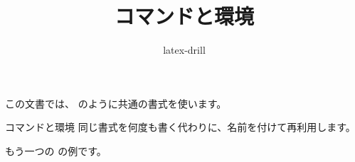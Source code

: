 \documentclass{jlreq}
\begin{document}
\title{コマンドと環境}
\author{latex-drill}
\maketitle

この文書では、 のように共通の書式を使います。

\begin{drillnote}{コマンドと環境}
同じ書式を何度も書く代わりに、名前を付けて再利用します。
\end{drillnote}

もう一つの  の例です。
\end{document}

